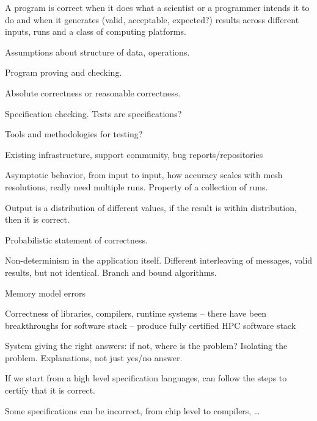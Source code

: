 \begin{compactitem}
\item A program is correct when it does what a scientist or a programmer intends it to do and when it generates (valid, acceptable, expected?) results across different  inputs, runs and a class of computing platforms. 


\item Assumptions about structure of data, operations. 

\item Program proving and  checking.

\item Absolute correctness or reasonable correctness. 

\item Specification checking. Tests are specifications? 

\item Tools and methodologies for testing?

\item Existing infrastructure, support community, bug reports/repositories

\item Asymptotic behavior, from input to input, how accuracy scales with mesh resolutions, really need multiple runs. Property of a collection of runs.

\begin{compactitem}
\item Output is a distribution of different values, if the result is within distribution, then it is correct. 
\end{compactitem}

\item Probabilistic statement of correctness. 

\item Non-determinism in the application itself. Different interleaving of messages, valid results, but not identical.  Branch and bound algorithms. 

\item Memory model errors 

\item Correctness of libraries, compilers, runtime systems – there have been breakthroughs for software stack – produce fully certified HPC software stack

\item System giving the right answers: if not, where is the problem? Isolating the problem.  Explanations, not just yes/no answer.

\item If we start from a high level specification languages, can follow the steps to certify that it is correct. 

\item Some specifications can be incorrect, from chip level to compilers, …

\end{compactitem}


